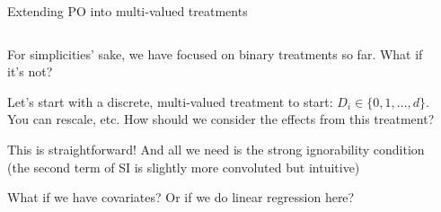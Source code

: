 \documentclass[notes,11pt, aspectratio=169]{beamer}
\newenvironment{wideitemize}{\itemize\addtolength{\itemsep}{10pt}}{\enditemize}
\begin{document}
\begin{frame}{Extending PO into multi-valued treatments}
\begin{columns}[T] %
  \begin{column}{.6\textwidth}
  \begin{wideitemize}
  \item For simplicities' sake, we have focused on binary treatments
    so far. What if it's not?
  \item Let's start with a discrete, multi-valued treatment to start:
    $D_{i} \in \{0,1, \ldots, d\}$. You can rescale, etc. How should
    we consider the effects from this treatment?
    \pause
  \item This is straightforward! And all we need is the strong
    ignorability condition (the second term of SI is slightly more
    convoluted but intuitive)
  \item What if we have covariates? Or if we do linear regression here?
  \end{wideitemize}

\end{column}%
  \hfill%
  \begin{column}{.4\textwidth}
    \footnotesize
  \end{column}
\end{columns}
\end{frame}
\end{document}
